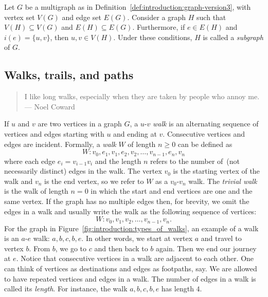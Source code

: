 Let $G$ be a multigraph as in
Definition~\ref{def:introduction:graph-version3}, with vertex set
$V(G)$ and edge set $E(G)$. Consider a graph $H$ such that
$V(H) \subseteq V(G)$ and $E(H) \subseteq E(G)$. Furthermore, if
$e \in E(H)$ and $i(e) = \{u,v\}$, then $u,v \in V(H)$. Under these
conditions, $H$ is called a \emph{subgraph} of $G$.



\subsection{Walks, trails, and paths}
\label{subsec:introduction:walks_trails_paths}

\begin{quote}
\footnotesize
I like long walks, especially when they are taken by people who annoy
me. \\
\noindent
--- Noel Coward
\end{quote}

\noindent
If $u$ and $v$ are two vertices in a graph $G$, a $u$-$v$
\emph{walk} is an alternating sequence of vertices and
edges starting with $u$ and ending at $v$. Consecutive vertices and
edges are incident. Formally, a \emph{walk} $W$ of length
$n \geq 0$ can be defined as
\[
W: v_0, e_1, v_1, e_2, v_2, \dots, v_{n-1}, e_n, v_n
\]
where each edge $e_i = v_{i-1} v_i$ and the length
$n$ refers to the number of~(not necessarily distinct) edges in the
walk. The vertex $v_0$ is the starting vertex of the walk and $v_n$ is
the end vertex, so we refer to $W$ as a $v_0$-$v_n$ walk. The
\emph{trivial walk} is the walk of length $n = 0$
in which the start and end vertices are one and the same vertex. If
the graph has no multiple edges then, for brevity, we omit the edges
in a walk and usually write the walk as the following sequence of
vertices:
\[
W: v_0, v_1, v_2, \dots, v_{n-1}, v_n.
\]
For the graph in Figure~\ref{fig:introduction:types_of_walks}, an
example of a walk is an $a$-$e$ walk: $a, b, c, b, e$. In other words,
we start at vertex $a$ and travel to vertex $b$. From $b$, we go to
$c$ and then back to $b$ again. Then we end our journey at $e$. Notice
that consecutive vertices in a walk are adjacent to each other. One
can think of vertices as destinations and edges as footpaths, say. We
are allowed to have repeated vertices and edges in a walk. The number
of edges in a walk is called its \emph{length}. For
instance, the walk $a, b, c, b, e$ has length $4$.

